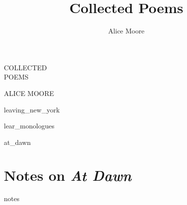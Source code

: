 \documentclass[ebook, twoside,openright, final]{memoir}
\title{Collected Poems}
\author{Alice Moore}
\date{}
\begin{document}
\setlength\epigraphwidth{5cm}
\setlength\epigraphrule{0pt}
\epigraphfontsize{\footnotesize}

\setlength\vgap{2.5em}
\setlength\vleftskip{0.5em}

\PlainPoemTitle

\frontmatter
\pagestyle{empty}

\begin{titlingpage}
\begingroup
\newlength{\drop}
\setlength{\drop}{0.12\textheight}
\vspace*{\drop}
\begin{center}
{\noindent\Huge COLLECTED}\\[\baselineskip]
{\Huge POEMS}\par
\vspace*{3\drop}
{\noindent\large \textsc{ALICE MOORE}}
\end{center}
\endgroup
\end{titlingpage}

\let\tocheadstart\relax
\tableofcontents*

\renewcommand{\printbookname}{}
\renewcommand{\printbooknum}{}
\renewcommand{\printpartnum}{}
\renewcommand{\printpartname}{}
\renewcommand{\printchaptername}{}
\renewcommand{\printchapternum}{}

\mainmatter
\pagestyle{myheadings}

{leaving_new_york}

{lear_monologues}

{at_dawn}

\renewcommand\appendixname{Notes}

\appendix

\chapter{Notes on \textit{At Dawn}}
{notes}
\end{document}
